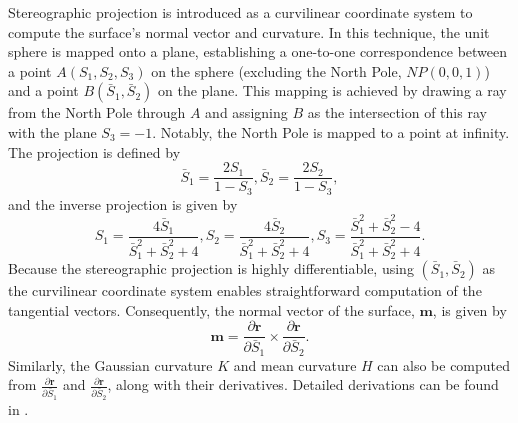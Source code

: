 \documentclass[journal]{IEEEtran}
\theoremstyle{definition}
\begin{document}
Stereographic projection is introduced as a curvilinear coordinate system to compute the surface's normal vector and curvature. In this technique, the unit sphere is mapped onto a plane, establishing a one-to-one correspondence between a point \(A(S_1, S_2, S_3)\) on the sphere (excluding the North Pole, \(NP(0,0,1)\)) and a point \(B(\bar{S}_1, \bar{S}_2)\) on the plane. This mapping is achieved by drawing a ray from the North Pole through \(A\) and assigning \(B\) as the intersection of this ray with the plane \(S_3 = -1\). Notably, the North Pole is mapped to a point at infinity. The projection is defined by
\begin{equation}
    \bar{S}_1 = \frac{2S_1}{1 - S_3},
    \bar{S}_2 = \frac{2S_2}{1 - S_3},
  \label{eq:stereographic_projection}
\end{equation}
and the inverse projection is given by
\begin{equation}
    S_1 = \frac{4\bar{S}_1}{\bar{S}_1^2 + \bar{S}_2^2 + 4},
    S_2 = \frac{4\bar{S}_2}{\bar{S}_1^2 + \bar{S}_2^2 + 4},
    S_3 = \frac{\bar{S}_1^2 + \bar{S}_2^2 - 4}{\bar{S}_1^2 + \bar{S}_2^2 + 4}.
  \label{eq:inverse_stereographic}
\end{equation}
Because the stereographic projection is highly differentiable, using \((\bar{S}_1, \bar{S}_2)\) as the curvilinear coordinate system enables straightforward computation of the tangential vectors. Consequently, the normal vector of the surface, \(\mathbf{m}\), is given by
\begin{equation}
  \mathbf{m} = \frac{\partial \mathbf{r}}{\partial \bar{S}_1} \times \frac{\partial \mathbf{r}}{\partial \bar{S}_2}.
  \label{eq:normal_vector}
\end{equation}
Similarly, the Gaussian curvature $K$ and mean curvature $H$ can also be computed from $\frac{\partial \mathbf{r}}{\partial \bar{S}_1}$ and $\frac{\partial \mathbf{r}}{\partial \bar{S}_2}$, along with their derivatives. Detailed derivations can be found in \cite{chen_morphological_2023}.
\end{document}
